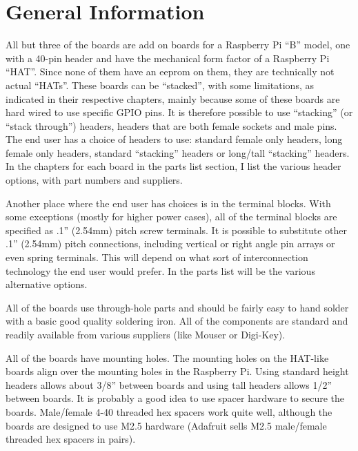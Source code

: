 \documentclass[12pt,notitlepage,twoside]{book}
\begin{document}
\chapter{General Information}

All but three of the boards are add on boards for a Raspberry Pi ``B'' model, 
one with a 40-pin header and have the mechanical form factor of a Raspberry Pi 
``HAT''.  Since none of them have an eeprom on them, they are technically not 
actual ``HATs''.  These boards can be ``stacked'', with some limitations, as 
indicated in their respective chapters, mainly because some of these boards 
are hard wired to use specific GPIO pins.  It is therefore possible to use 
``stacking'' (or ``stack through'') headers, headers that are both female 
sockets and male pins.  The end user has a choice of headers to use: standard 
female only headers, long female only headers, standard ``stacking'' headers 
or long/tall ``stacking'' headers.  In the chapters for each board in the 
parts list section, I list the various header options, with part numbers and 
suppliers.

Another place where the end user has choices is in the terminal blocks.  With 
some exceptions (mostly for higher power cases), all of the terminal blocks 
are specified as .1'' (2.54mm) pitch screw terminals.  It is possible to 
substitute other .1'' (2.54mm) pitch connections, including vertical or right 
angle pin arrays or even spring terminals.  This will depend on what sort of 
interconnection technology the end user would prefer.  In the parts list will 
be the various alternative options.

All of the boards use through-hole parts and should be fairly easy to hand 
solder with a basic good quality soldering iron.  All of the components are 
standard and readily available from various suppliers (like Mouser or 
Digi-Key).

All of the boards have mounting holes.  The mounting holes on the HAT-like 
boards align over the mounting holes in the Raspberry Pi.  Using standard 
height headers allows about 3/8'' between boards and using tall headers allows 
1/2'' between boards.  It is probably a good idea to use spacer hardware to 
secure the boards.  Male/female 4-40 threaded hex spacers work quite well, 
although the boards are designed to use M2.5 hardware (Adafruit sells M2.5 
male/female threaded hex spacers in pairs).
















\cleardoublepage
%
%
\cleardoublepage
\printindex
\end{document}

